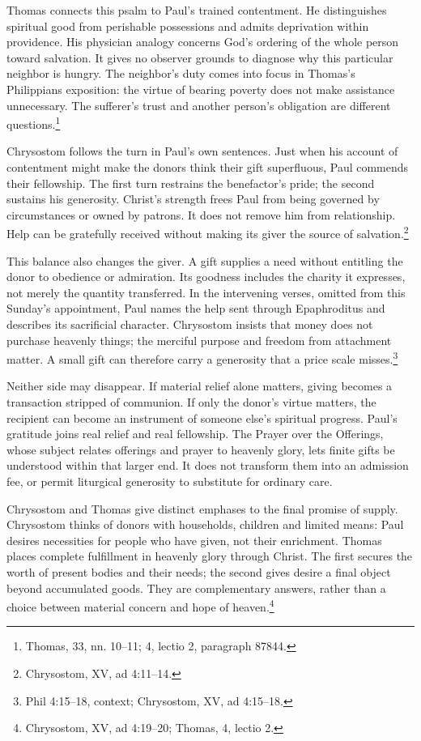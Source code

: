 Thomas connects this psalm to Paul's trained contentment. He distinguishes spiritual good from perishable possessions and admits deprivation within providence. His physician analogy concerns God's ordering of the whole person toward salvation. It gives no observer grounds to diagnose why this particular neighbor is hungry. The neighbor's duty comes into focus in Thomas's Philippians exposition: the virtue of bearing poverty does not make assistance unnecessary. The sufferer's trust and another person's obligation are different questions.\footnote{Thomas,  33, nn. 10--11;  4, lectio 2, paragraph 87844.}

Chrysostom follows the turn in Paul's own sentences. Just when his account of contentment might make the donors think their gift superfluous, Paul commends their fellowship. The first turn restrains the benefactor's pride; the second sustains his generosity. Christ's strength frees Paul from being governed by circumstances or owned by patrons. It does not remove him from relationship. Help can be gratefully received without making its giver the source of salvation.\footnote{Chrysostom,  XV, ad 4:11--14.}

This balance also changes the giver. A gift supplies a need without entitling the donor to obedience or admiration. Its goodness includes the charity it expresses, not merely the quantity transferred. In the intervening verses, omitted from this Sunday's appointment, Paul names the help sent through Epaphroditus and describes its sacrificial character. Chrysostom insists that money does not purchase heavenly things; the merciful purpose and freedom from attachment matter. A small gift can therefore carry a generosity that a price scale misses.\footnote{Phil 4:15--18, context; Chrysostom,  XV, ad 4:15--18.}

Neither side may disappear. If material relief alone matters, giving becomes a transaction stripped of communion. If only the donor's virtue matters, the recipient can become an instrument of someone else's spiritual progress. Paul's gratitude joins real relief and real fellowship. The Prayer over the Offerings, whose subject relates offerings and prayer to heavenly glory, lets finite gifts be understood within that larger end. It does not transform them into an admission fee, or permit liturgical generosity to substitute for ordinary care.

Chrysostom and Thomas give distinct emphases to the final promise of supply. Chrysostom thinks of donors with households, children and limited means: Paul desires necessities for people who have given, not their enrichment. Thomas places complete fulfillment in heavenly glory through Christ. The first secures the worth of present bodies and their needs; the second gives desire a final object beyond accumulated goods. They are complementary answers, rather than a choice between material concern and hope of heaven.\footnote{Chrysostom,  XV, ad 4:19--20; Thomas,  4, lectio 2.}

